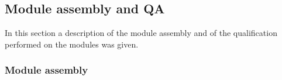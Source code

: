 


\subsection{Module assembly and QA}
In this section a description of the module assembly and of the qualification performed on the modules was given.

\subsubsection{Module assembly}
\label{sec:mod_bumping}


